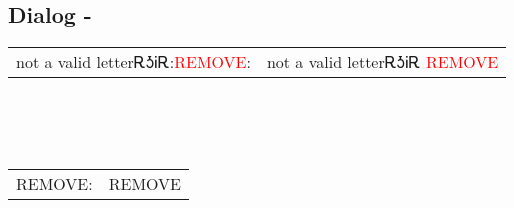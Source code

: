 \subsection{Dialog - }
\begin{tabular}{p{2cm} p{11cm}}
not a valid letterᎡᎼᎥᎡ:\newline \textcolor{red}{REMOVE}: & not a valid letterᎡᎼᎥᎡ 
\newline\textcolor{red}{REMOVE}\\
\end{tabular}
\\
\\
\\
\noindent\begin{tabular}{p{2cm} p{11cm}}REMOVE: & REMOVE\\
\end{tabular}
